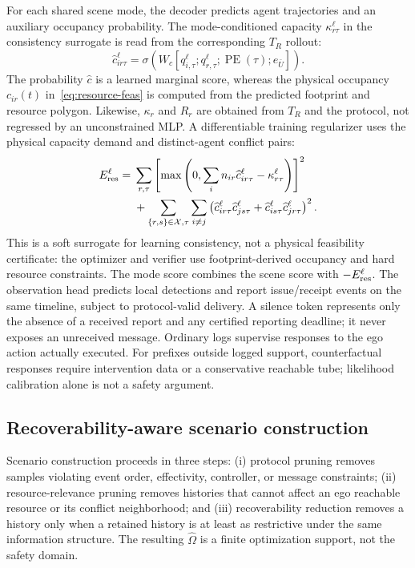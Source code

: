 \documentclass[letterpaper]{article} %
\newcommand{\Xset}{\ensuremath{\mathcal X}}
\begin{document}
For each shared scene mode, the decoder predicts agent trajectories and an auxiliary occupancy
probability. The mode-conditioned capacity $\kappa_{r\tau}^{\ell}$ in the
consistency surrogate is read from the corresponding $T_R$ rollout:
\begin{equation}
\widehat c_{ir\tau}^{\ell}=\sigma\!\left(W_c[q_{i,\tau}^{\ell};
q_{r,\tau}^{\ell};\operatorname{PE}(\tau);e_{\bar U}]\right).
\label{eq:occupancy-head}
\end{equation}
The probability $\widehat c$ is a learned marginal score, whereas the
physical occupancy $c_{ir}(t)$ in~\eqref{eq:resource-feas} is computed from
the predicted footprint and resource polygon. Likewise, $\kappa_r$ and
$R_r$ are obtained from $T_R$ and the protocol, not regressed by an
unconstrained MLP. A differentiable training regularizer uses the physical
capacity demand and distinct-agent conflict pairs:
\begin{align}
E_{\rm res}^{\ell}={}&\sum_{r,\tau}
\left[\max\left(0,\sum_i n_{ir}\widehat c_{ir\tau}^{\ell}
-\kappa_{r\tau}^{\ell}\right)\right]^2\nonumber\\
&+\sum_{\{r,s\}\in\Xset,\tau}
\sum_{i\ne j}\left(
\widehat c_{ir\tau}^{\ell}\widehat c_{js\tau}^{\ell}
+\widehat c_{is\tau}^{\ell}\widehat c_{jr\tau}^{\ell}
\right)^2.
\label{eq:resource-energy}
\end{align}
This is a soft surrogate for learning consistency, not a physical feasibility
certificate: the optimizer and verifier use footprint-derived occupancy and
hard resource constraints. The mode score combines the scene score with
$-E_{\rm res}^{\ell}$. The observation head predicts local detections and
report issue/receipt events on the same timeline, subject to protocol-valid
delivery. A silence token represents only the absence of a received report
and any certified reporting deadline; it never exposes an unreceived message.
Ordinary logs supervise responses to the ego action actually executed. For
prefixes outside logged support, counterfactual responses require intervention
data or a conservative reachable tube; likelihood calibration alone is not a
safety argument.

\subsection{Recoverability-aware scenario construction}
\label{sec:scenario}
Scenario construction proceeds in three steps: (i) protocol pruning removes
samples violating event order, effectivity, controller, or message constraints;
(ii) resource-relevance pruning removes histories that cannot affect an ego
reachable resource or its conflict neighborhood; and (iii) recoverability
reduction removes a history only when a retained history is at least as
restrictive under the same information structure. The resulting
$\widehat\Omega$ is a finite optimization support, not the safety domain.
\end{document}
